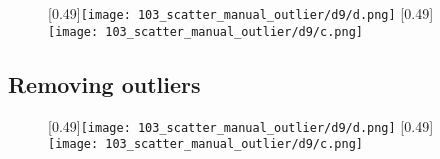 \begin{figure}
[0.49\linewidth]{\texttt{[image: 103\_scatter\_manual\_outlier/d9/d.png]}}
[0.49\linewidth]{\texttt{[image: 103\_scatter\_manual\_outlier/d9/c.png]}}
\caption{}
\label{fig:scatter_manual_outlier}
\end{figure}





\subsection{Removing outliers}
\begin{figure}
[0.49\linewidth]{\texttt{[image: 103\_scatter\_manual\_outlier/d9/d.png]}}
[0.49\linewidth]{\texttt{[image: 103\_scatter\_manual\_outlier/d9/c.png]}}
\caption{}
\label{fig:scatter_manual_outlier}
\end{figure}

